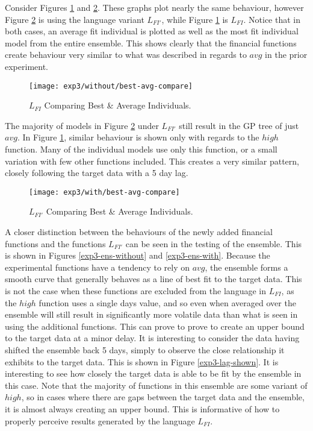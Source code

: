 \documentclass[12pt, letterpaper]{article}
\begin{document}
\textrm{ \indent Consider Figures \ref{exp3-inds-without} and \ref{exp3-inds-with}. These graphs plot nearly the same behaviour, however Figure \ref{exp3-inds-with} is using the language variant $L_{FI'}$, while Figure \ref{exp3-inds-without} is $L_{FI}$. Notice that in both cases, an average fit individual is plotted as well as the most fit individual model from the entire ensemble. This shows clearly that the financial functions create behaviour very similar to what was described in regards to $avg$ in the prior experiment. }

\begin{figure}[!htb]
\centering
\texttt{[image: exp3/without/best-avg-compare]}
\caption{ $L_{FI}$ Comparing Best \& Average Individuals.}
\label{exp3-inds-without}
\end{figure}

\textrm{\indent The majority of models in Figure \ref{exp3-inds-with} under $L_{FI'}$ still result in the GP tree of just $avg$. In Figure \ref{exp3-inds-without}, similar behaviour is shown only with regards to the $high$ function. Many of the individual models use only this function, or a small variation with few other functions included. This creates a very similar pattern, closely following the target data with a 5 day lag.  }

\begin{figure}[!htb]
\centering
\texttt{[image: exp3/with/best-avg-compare]}
\caption{ $L_{FI'}$ Comparing Best \& Average Individuals.}
\label{exp3-inds-with}
\end{figure}

\textrm{ \indent A closer distinction between the behaviours of the newly added financial functions and the functions $L_{FI'}$ can be seen in the testing of the ensemble. This is shown in Figures \ref{exp3-ens-without} and \ref{exp3-ens-with}. Because the experimental functions have a tendency to rely on $avg$, the ensemble forms a smooth curve that generally behaves as a line of best fit to the target data. This is not the case when these functions are excluded from the language in $L_{FI}$, as the $high$ function uses a single days value, and so even when averaged over the ensemble will still result in significantly more volatile data than what is seen in using the additional functions. This can prove to prove to create an upper bound to the target data at a minor delay. It is interesting to consider the data having shifted the ensemble back 5 days, simply to observe the close relationship it exhibits to the target data. This is shown in Figure \ref{exp3-lag-shown}. It is interesting to see how closely the target data is able to be fit by the ensemble in this case. Note that the majority of functions in this ensemble are some variant of $high$, so in cases where there are gaps between the target data and the ensemble, it is almost always creating an upper bound. This is informative of how to properly perceive results generated by the language $L_{FI}$.  }
\end{document}

